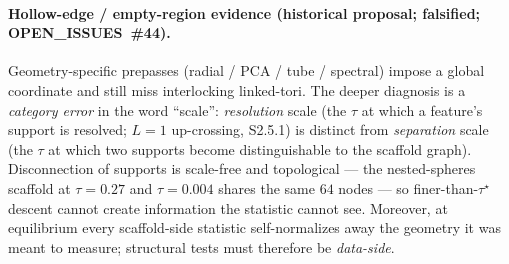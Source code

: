 \documentclass[11pt]{article}
\begin{document}
\paragraph{Hollow-edge / empty-region evidence (historical proposal;
falsified; OPEN\_ISSUES~\#44).}
\label{sec:si-hollow-edge}
Geometry-specific prepasses (radial / PCA / tube / spectral) impose a global
coordinate and still miss interlocking linked-tori. The deeper diagnosis is a
\emph{category error} in the word ``scale'': \emph{resolution} scale (the
$\tau$ at which a feature's support is resolved; $L{=}1$ up-crossing, S2.5.1)
is distinct from \emph{separation} scale (the $\tau$ at which two supports
become distinguishable to the scaffold graph). Disconnection of supports is
scale-free and topological --- the nested-spheres scaffold at $\tau{=}0.27$ and
$\tau{=}0.004$ shares the same $64$ nodes --- so finer-than-$\tau^\star$
descent cannot create information the statistic cannot see. Moreover, at
equilibrium every scaffold-side statistic self-normalizes away the geometry it
was meant to measure; structural tests must therefore be \emph{data-side}.
\end{document}
